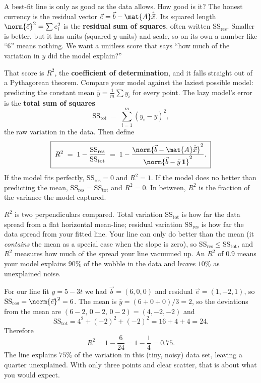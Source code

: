 A best-fit line is only as good as the data allows. How good is it? The honest currency is the
residual vector $\vec{e}=\vec{b}-\mat{A}\hat{\vec{x}}$. Its squared length
$\norm{\vec{e}}^2=\sum e_i^2$ is the \textbf{residual sum of squares}, often written $\mathrm{SS_{res}}$.
Smaller is better, but it has units (squared $y$-units) and scale, so on its own a number like
``$6$'' means nothing. We want a unitless score that says ``how much of the variation in $y$ did
the model explain?''

That score is $R^2$, the \textbf{coefficient of determination}, and it falls straight out of a
Pythagorean theorem. Compare your model against the laziest possible model: predicting the constant
mean $\bar{y}=\tfrac1m\sum y_i$ for every point. The lazy model's error is the
\textbf{total sum of squares}
\[
  \mathrm{SS_{tot}} \;=\; \sum_{i=1}^m (y_i-\bar{y})^2,
\]
the raw variation in the data. Then define
\[
  \boxed{\;R^2 \;=\; 1 - \dfrac{\mathrm{SS_{res}}}{\mathrm{SS_{tot}}}
  \;=\; 1 - \dfrac{\norm{\vec{b}-\mat{A}\hat{\vec{x}}}^2}{\norm{\vec{b}-\bar{y}\,\mathbf{1}}^2}.\;}
\]
If the model fits perfectly, $\mathrm{SS_{res}}=0$ and $R^2=1$. If the model does no better than
predicting the mean, $\mathrm{SS_{res}}=\mathrm{SS_{tot}}$ and $R^2=0$. In between, $R^2$ is the
fraction of the variance the model captured.

\begin{intuitionbox}
$R^2$ is two perpendiculars compared. Total variation $\mathrm{SS_{tot}}$ is how far the data
spread from a flat horizontal mean-line; residual variation $\mathrm{SS_{res}}$ is how far the
data spread from your fitted line. Your line can only do better than the mean (it \emph{contains}
the mean as a special case when the slope is zero), so $\mathrm{SS_{res}}\le\mathrm{SS_{tot}}$, and
$R^2$ measures how much of the spread your line vacuumed up. An $R^2$ of $0.9$ means your model
explains $90\%$ of the wobble in the data and leaves $10\%$ as unexplained noise.
\end{intuitionbox}

\begin{example}\label{ch19:rsquared}
For our line fit $y=5-3t$ we had $\vec{b}=(6,0,0)$ and residual $\vec{e}=(1,-2,1)$, so
$\mathrm{SS_{res}}=\norm{\vec{e}}^2=6$. The mean is $\bar{y}=(6+0+0)/3=2$, so the deviations from
the mean are $(6-2,\,0-2,\,0-2)=(4,-2,-2)$ and
\[
  \mathrm{SS_{tot}} = 4^2+(-2)^2+(-2)^2 = 16+4+4 = 24.
\]
Therefore
\[
  R^2 = 1-\frac{6}{24} = 1-\frac14 = 0.75 .
\]
The line explains $75\%$ of the variation in this (tiny, noisy) data set, leaving a quarter
unexplained. With only three points and clear scatter, that is about what you would expect.
\end{example}

